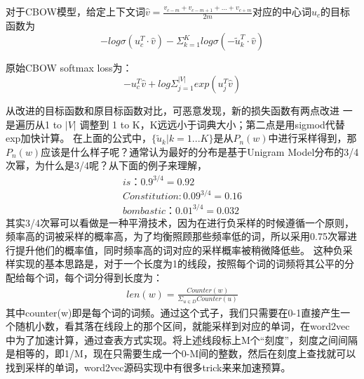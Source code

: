 \documentclass[twoside,nofonts,fancyhdr,openany,UTF8]{ctexbook}
\begin{document}
对于CBOW模型，给定上下文词$\widehat{v}=\frac{v_{c-m}+v_{c-m+1}+...+v_{c+m}}{2m}$对应的中心词$u_c$的目标函数为
$$-log\sigma{(u_{c}^{T}\cdot{\widehat{v}})}-\Sigma_{k=1}^{K}log\sigma{(-\widetilde{u}_{k}^{T}\cdot{\widehat{v}})}$$

原始CBOW softmax loss为：
$$-u_{c}^{T}\widehat{v}+log\Sigma_{j=1}^{|V|}exp{(u_{j}^{T}\widehat{v})} $$

从改进的目标函数和原目标函数对比，可恶意发现，新的损失函数有两点改进 一是遍历从1 to $|V|$ 调整到 1 to K，K远远小于词典大小；第二点是用sigmod代替exp加快计算。
在上面的公式中，$\{\widetilde{u}_k|k=1...K\}$是从$P_n(w)$中进行采样得到，那$P_n(w)$应该是什么样子呢？通常认为最好的分布是基于Unigram Model分布的3/4次幂，为什么是3/4呢？从下面的例子来理解，
% 
\begin{align}
is： 0.9^{3/4} = 0.92 \\
Constitution: 0.09^{3/4} = 0.16 \\
bombastic：0.01^{3/4} = 0.032
\end{align}
其实3/4次幂可以看做是一种平滑技术，因为在进行负采样的时候遵循一个原则，频率高的词被采样的概率高，为了均衡照顾那些频率低的词，所以采用0.75次幂进行提升他们的概率值，同时频率高的词对应的采样概率被稍微降低些。
这种负采样实现的基本思路是，对于一个长度为1的线段，按照每个词的词频将其公平的分配给每个词，每个词分得到长度为：
\begin{align}
len(w)=\frac{Counter(w)}{\Sigma_{u \in D}Counter(u)}
\end{align}
其中counter(w)即是每个词的词频。通过这个式子，我们只需要在0-1直接产生一个随机小数，看其落在线段上的那个区间，就能采样到对应的单词，在word2vec中为了加速计算，通过查表方式实现。将上述线段标上M个“刻度”，刻度之间间隔是相等的，即1/M，现在只需要生成一个0-M间的整数，然后在刻度上查找就可以找到采样的单词，word2vec源码实现中有很多trick来来加速预算。
\end{document}

